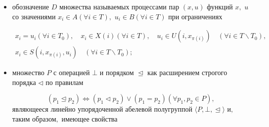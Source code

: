 \begin{task}[$\mathfrak{A}$]
\begin{itemize}
$$X(i)\subset A(\forall i\in T),\quad U(i,\alpha )\subset B(\forall i\in

T\backslash T_0 )(\forall \alpha \in A),$$ 

 $$S(i,\alpha ,\beta )\subset A(\vert S(i,\alpha ,\beta )\vert \le 1)(\forall i\in T\backslash T_0)

 (\forall \alpha \in A) (\forall \beta \in B);$$



\item[--] обозначение $D$ множества называемых процессами пар $(x,u)$ функций $x,$ $u$ со значениями $x_i \in A(\forall i\in T),$ $u_i \in B(\forall i\in T)$ при ограничениях

\begin{gather*}

x_i =u_i (\forall i\in T_0 ),

\quad

x_i \in X(i)(\forall i\in T),

\quad

u_i \in U(i,x_{\pi (i)} )

\quad

(\forall i\in T\backslash T_0 ),\\

x_i \in S(i,x_{\pi (i)} ,u_i )

\quad

(\forall i\in T\backslash T_0 );

\end{gather*}



\item[--] множество $P$ с операцией $\bot$  и порядком $\trianglelefteq$ как расширением строгого порядка $\triangleleft $ по правилам 

$$(p_1 \trianglelefteq p_2

)\Leftrightarrow (p_1 \triangleleft p_2 )\vee (p_1 =p_2 )(\forall p_1 ,p_2

\in P),$$ являющееся линейно упорядоченной абелевой полугруппой $\langle P ,\bot ,\trianglelefteq \rangle $ и$,$ таким образом$,$ имеющее свойства

\end{itemize}
\end{task}

